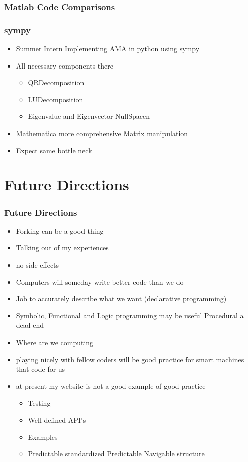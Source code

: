 \documentclass{beamer}
\begin{document}
\begin{frame}
  \frametitle{Matlab Code Comparisons}
  
\end{frame}




\begin{frame}
  \frametitle{sympy}
  
  \begin{itemize}
  \item Summer Intern Implementing AMA in python using sympy
  \item All necessary components there
    \begin{itemize}
    \item QRDecomposition
    \item LUDecomposition
    \item Eigenvalue and Eigenvector  NullSpacen
    \end{itemize}
  \item Mathematica more comprehensive Matrix manipulation
  \item Expect same bottle neck
  \end{itemize}
\end{frame}



\section{Future Directions}

\begin{frame}
  \frametitle{Future Directions}
  \begin{itemize}
  \item Forking can be a good thing
  \item Talking out of my experiences
  \item no side effects
  \item Computers will someday write better code than we do
  \item Job to accurately describe what we want  (declarative programming)
  \item Symbolic, Functional and Logic programming may be useful Procedural
a dead end
\item Where are we computing
\item playing nicely with fellow coders will be good practice for smart 
machines that code for us
  \item at present my website is not a good example of good practice
    \begin{itemize}
    \item Testing
    \item Well defined API's
    \item Examples
    \item Predictable standardized Predictable Navigable structure
    \end{itemize}
  \end{itemize}
\end{frame}
\end{document}
